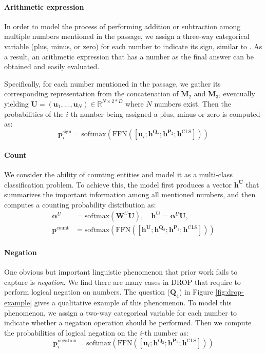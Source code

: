 \documentclass[11pt,a4paper]{article}
\begin{document}
\paragraph{Arithmetic expression} 
In order to model the process of performing addition or subtraction among multiple numbers mentioned in the passage, we assign a three-way categorical variable (plus, minus, or zero) for each number to indicate its sign, similar to \citet{dua2019drop}. 
As a result, an arithmetic expression that has a number as the final answer can be obtained and easily evaluated.

Specifically, for each number mentioned in the passage, we gather its corresponding representation from the concatenation of $\mathbf{M}_2$ and $\mathbf{M}_3$, eventually yielding $\mathbf{U} = (\mathbf{u}_1, ..., \mathbf{u}_N) \in\mathbb{R}^{N \times 2*D}$ where $N$ numbers exist. 
Then the probabilities of the $i$-th number being assigned a plus, minus or zero is computed as:
\begin{equation}
	\mathbf{p}^{\mathrm{sign}}_i = \mathrm{softmax}(\mathrm{FFN}([\mathbf{u}_i; \mathbf{h}^{\mathbf{Q}_2}; \mathbf{h}^{\mathbf{P}_2}; \mathbf{h}^{\mathrm{CLS}}])) \nonumber
\end{equation}

\paragraph{Count} 
We consider the ability of counting entities and model it as a multi-class classification problem. 
To achieve this, the model first produces a vector $\mathbf{h}^{\mathbf{U}}$ that summarizes the important information among all mentioned numbers, and then computes a counting probability distribution as:
\begin{align}
	\boldsymbol{\alpha}^U &= \mathrm{softmax}(\mathbf{W}^U \mathbf{U}), \quad \mathbf{h}^{\mathbf{U}} = \boldsymbol{\alpha}^U \mathbf{U} \nonumber, \\
	\mathbf{p}^{\mathrm{count}} &= \mathrm{softmax}(\mathrm{FFN}([\mathbf{h}^{\mathbf{U}}; \mathbf{h}^{\mathbf{Q}_2}; \mathbf{h}^{\mathbf{P}_2}; \mathbf{h}^{\mathrm{CLS}}])) \nonumber
\end{align}


\paragraph{Negation}
One obvious but important linguistic phenomenon that prior work fails to capture is \emph{negation}. 
We find there are many cases in DROP that require to perform logical negation on numbers.
The question ($\mathbf{Q}_4$) in Figure \ref{fig:drop-example} gives a qualitative example of this phenomenon.
To model this phenomenon, we assign a two-way categorical variable for each number to indicate whether a negation operation should be performed.
Then we compute the probabilities of logical negation on the $i$-th number as:
\begin{equation}
	\mathbf{p}^{\mathrm{negation}}_i = \mathrm{softmax}(\mathrm{FFN}([\mathbf{u}_i; \mathbf{h}^{\mathbf{Q}_2}; \mathbf{h}^{\mathbf{P}_2}; \mathbf{h}^{\mathrm{CLS}}])) \nonumber
\end{equation}
\end{document}
